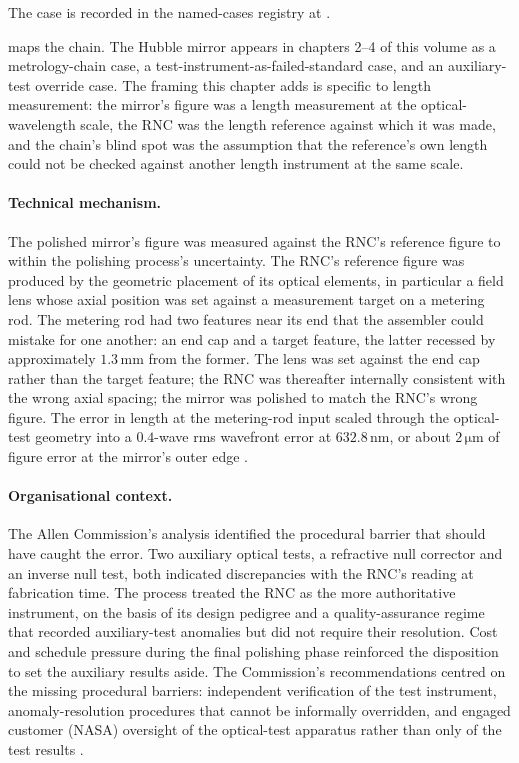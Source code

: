 The case is recorded in the named-cases registry at
.



 maps the chain. The Hubble
mirror appears in chapters 2--4 of this volume as a metrology-chain
case, a test-instrument-as-failed-standard case, and an
auxiliary-test override case. The framing this chapter adds is
specific to length measurement: the mirror's figure was a length
measurement at the optical-wavelength scale, the RNC was the length
reference against which it was made, and the chain's blind spot was
the assumption that the reference's own length could not be checked
against another length instrument at the same scale.

\paragraph{Technical mechanism.}
The polished mirror's figure was measured against the RNC's
reference figure to within the polishing process's uncertainty. The
RNC's reference figure was produced by the geometric placement of
its optical elements, in particular a field lens whose axial
position was set against a measurement target on a metering rod.
The metering rod had two features near its end that the assembler
could mistake for one another: an end cap and a target feature, the
latter recessed by approximately $1.3 \,\si{\milli\meter}$ from the
former. The lens was set against the end cap rather than the target
feature; the RNC was thereafter internally consistent with the
wrong axial spacing; the mirror was polished to match the RNC's
wrong figure. The error in length at the metering-rod input scaled
through the optical-test geometry into a $0.4$-wave rms wavefront
error at $632.8 \,\si{\nano\meter}$, or about $2 \,\si{\micro\meter}$
of figure error at the mirror's outer edge
\cite{acc:nasa-hubble-optical-systems-1990}.

\paragraph{Organisational context.}
The Allen Commission's analysis identified the procedural barrier
that should have caught the error. Two auxiliary optical tests, a
refractive null corrector and an inverse null test, both indicated
discrepancies with the RNC's reading at fabrication time. The
process treated the RNC as the more authoritative instrument, on
the basis of its design pedigree and a quality-assurance regime
that recorded auxiliary-test anomalies but did not require their
resolution. Cost and schedule pressure during the final polishing
phase reinforced the disposition to set the auxiliary results
aside. The Commission's recommendations centred on the missing
procedural barriers: independent verification of the test
instrument, anomaly-resolution procedures that cannot be informally
overridden, and engaged customer (NASA) oversight of the
optical-test apparatus rather than only of the test results
\cite{acc:nasa-hubble-optical-systems-1990}.

